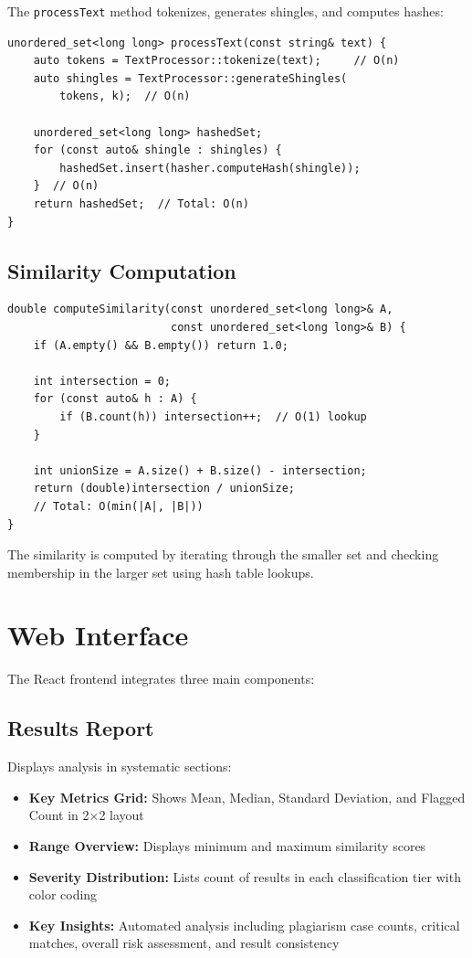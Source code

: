 \documentclass[12pt,oneside,openany]{report}
\begin{document}
The \texttt{processText} method tokenizes, generates shingles, and computes hashes:

\begin{lstlisting}
unordered_set<long long> processText(const string& text) {
    auto tokens = TextProcessor::tokenize(text);     // O(n)
    auto shingles = TextProcessor::generateShingles(
        tokens, k);  // O(n)
    
    unordered_set<long long> hashedSet;
    for (const auto& shingle : shingles) {
        hashedSet.insert(hasher.computeHash(shingle));
    }  // O(n)
    return hashedSet;  // Total: O(n)
}
\end{lstlisting}

\subsection{Similarity Computation}

\begin{lstlisting}
double computeSimilarity(const unordered_set<long long>& A,
                         const unordered_set<long long>& B) {
    if (A.empty() && B.empty()) return 1.0;
    
    int intersection = 0;
    for (const auto& h : A) {
        if (B.count(h)) intersection++;  // O(1) lookup
    }
    
    int unionSize = A.size() + B.size() - intersection;
    return (double)intersection / unionSize;  
    // Total: O(min(|A|, |B|))
}
\end{lstlisting}

The similarity is computed by iterating through the smaller set and checking membership in the larger set using hash table lookups.

\section{Web Interface}

The React frontend integrates three main components:

\subsection{Results Report}

Displays analysis in systematic sections:
\begin{itemize}
  \item \textbf{Key Metrics Grid:} Shows Mean, Median, Standard Deviation, and Flagged Count in 2×2 layout
  \item \textbf{Range Overview:} Displays minimum and maximum similarity scores
  \item \textbf{Severity Distribution:} Lists count of results in each classification tier with color coding
  \item \textbf{Key Insights:} Automated analysis including plagiarism case counts, critical matches, overall risk assessment, and result consistency
\end{itemize}
\end{document}
